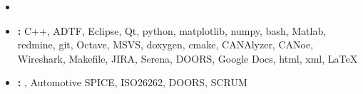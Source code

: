 \documentclass[letterpaper]{twentysecondcv} %
\newif\ifen{}
\newif\ifspa{}
\newcommand{\en}[1]{\ifen#1\fi}
\newcommand{\spa}[1]{\ifspa#1\fi}
\begin{document}
\begin{twenty}
{\begin{itemize}
{			      }\spa{Mantuve una comunicación eficiente con el Cliente.}
			\item \en{Performed weekly software verifications: sanity checks, runtime checks, code coverage tests, static tests (code linting against MISRA-C++) and reported them to the Client.  }
			\item \textbf{\en{Tools}:} C++, ADTF, Eclipse, Qt, python,
			      matplotlib, numpy, bash, Matlab, redmine, git, Octave, MSVS,
			      doxygen, cmake, CANAlyzer, CANoe, Wireshark, Makefile, JIRA,
			      Serena, DOORS, Google Docs, html, xml, \LaTeX{}
			\item \textbf{\en{Attended Courses}:} \en{V Life
				      Cycle, Management of Requirements}, Automotive SPICE, ISO26262, DOORS, SCRUM
		\end{itemize}}
\end{twenty}
\end{document}
